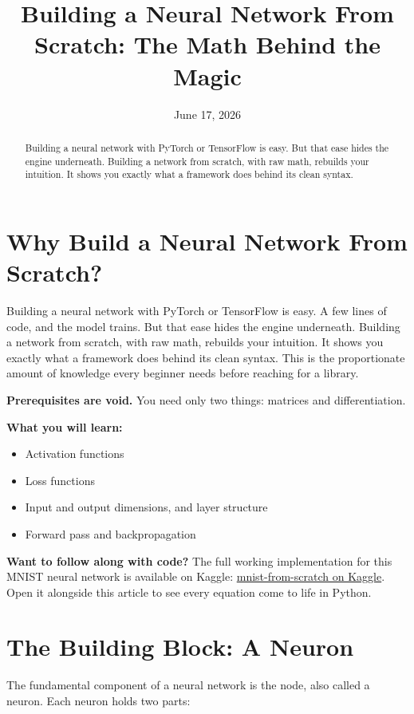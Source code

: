 \documentclass[11pt]{article}
\title{Building a Neural Network From Scratch: The Math Behind the Magic}
\author{}
\date{June 17, 2026}
\begin{document}
\maketitle

\begin{abstract}
Building a neural network with PyTorch or TensorFlow is easy. But that ease hides the engine underneath. Building a network from scratch, with raw math, rebuilds your intuition. It shows you exactly what a framework does behind its clean syntax.
\end{abstract}

\section*{Why Build a Neural Network From Scratch?}

Building a neural network with PyTorch or TensorFlow is easy. A few lines of code, and the model trains. But that ease hides the engine underneath. Building a network from scratch, with raw math, rebuilds your intuition. It shows you exactly what a framework does behind its clean syntax. This is the proportionate amount of knowledge every beginner needs before reaching for a library.

\textbf{Prerequisites are void.} You need only two things: matrices and differentiation.

\textbf{What you will learn:}
\begin{itemize}[noitemsep]
    \item Activation functions
    \item Loss functions
    \item Input and output dimensions, and layer structure
    \item Forward pass and backpropagation
\end{itemize}

\textbf{Want to follow along with code?} The full working implementation for this MNIST neural network is available on Kaggle: \href{https://www.kaggle.com/code/bhuvannr2006/mnist-from-scratch}{mnist-from-scratch on Kaggle}. Open it alongside this article to see every equation come to life in Python.

\section*{The Building Block: A Neuron}

The fundamental component of a neural network is the node, also called a neuron. Each neuron holds two parts:
\end{document}
